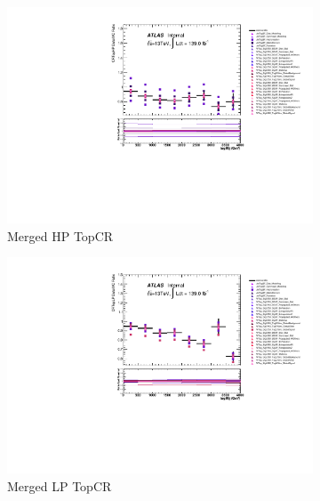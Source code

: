 \begin{figure}[ht]
    \centering
    \begin{subfigure}[b]{0.32\textwidth}
        \centering
        \includegraphics[width=\textwidth]{figures/1lep/VTaggerUnc/VTagCRTopHPtagMjj_SystBreakDown.pdf}
        \caption{Merged HP TopCR}
        \label{fig:MergedHPTopCR}
    \end{subfigure}
    \begin{subfigure}[b]{0.32\textwidth}
        \centering
        \includegraphics[width=\textwidth]{figures/1lep/VTaggerUnc/VTagCRTopLPtagMjj_SystBreakDown.pdf}
        \caption{Merged LP TopCR}
        \label{fig:MergedLPTopCR}
    \end{subfigure}
    \begin{subfigure}[b]{0.32\textwidth}
        \centering

\end{subfigure}
\end{figure}

